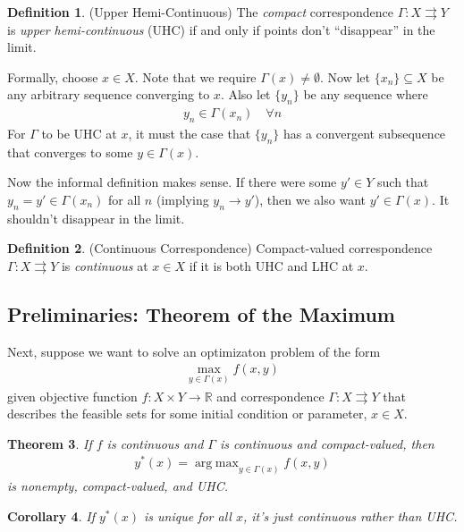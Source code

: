 \documentclass[12pt]{article}
\numberwithin{equation}{section} %
\theoremstyle{plain}
\newtheorem{thm}{Theorem}[section]
\newtheorem{cor}[thm]{Corollary}
\theoremstyle{definition}
\newtheorem{defn}[thm]{Definition}
\theoremstyle{remark}
\newcommand{\R}{\mathbb{R}}
\DeclareMathOperator*{\argmax}{arg\;max}
\begin{document}
\begin{defn}{(Upper Hemi-Continuous)}
The \emph{compact} correspondence $\Gamma:X\rightrightarrows Y$ is
\emph{upper hemi-continuous} (UHC) if and only if points don't
``disappear'' in the limit.

Formally, choose $x\in X$. Note that we require
$\Gamma(x)\neq\emptyset$. Now let $\{x_n\}\subseteq X$ be any arbitrary
sequence converging to $x$. Also let $\{y_n\}$ be any sequence where
\begin{align*}
  y_n \in \Gamma(x_n) \quad\forall n
\end{align*}
For $\Gamma$ to be UHC at $x$, it must the case that $\{y_n\}$ has a
convergent subsequence that converges to some $y\in \Gamma(x)$.

Now the informal definition makes sense. If there were some $y'\in Y$
such that $y_n = y' \in \Gamma(x_n)$ for all $n$ (implying
$y_n\rightarrow y'$), then we also want $y'\in \Gamma(x)$. It shouldn't
disappear in the limit.
\end{defn}

\begin{defn}{(Continuous Correspondence)}
Compact-valued correspondence $\Gamma:X\rightrightarrows Y$ is
\emph{continuous} at $x\in X$ if it is both UHC and LHC at $x$.
\end{defn}

\subsection{Preliminaries: Theorem of the Maximum}

Next, suppose we want to solve an optimizaton problem of the form
\begin{align*}
  \max_{y\in \Gamma(x)} f(x,y)
\end{align*}
given objective function $f:X\times Y\rightarrow\R$ and correspondence
$\Gamma:X\rightrightarrows Y$ that describes the feasible sets for some
initial condition or parameter, $x\in X$.

\begin{thm}
If $f$ is continuous and $\Gamma$ is continuous and compact-valued, then
\begin{align*}
  y^*(x) = \argmax_{y\in\Gamma(x)} f(x,y)
\end{align*}
is nonempty, compact-valued, and UHC.
\end{thm}

\begin{cor}
If $y^*(x)$ is unique for all $x$, it's just continuous rather than UHC.
\end{cor}
\end{document}
